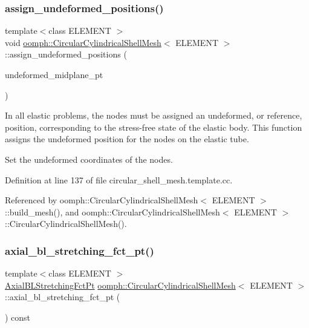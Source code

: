 \subsubsection{\texorpdfstring{assign\+\_\+undeformed\+\_\+positions()}{assign\_undeformed\_positions()}}
{\footnotesize\ttfamily template$<$class E\+L\+E\+M\+E\+NT $>$ \\
void \hyperlink{classoomph_1_1CircularCylindricalShellMesh}{oomph\+::\+Circular\+Cylindrical\+Shell\+Mesh}$<$ E\+L\+E\+M\+E\+NT $>$\+::assign\+\_\+undeformed\+\_\+positions (\begin{DoxyParamCaption}\item[{Geom\+Object $\ast$const \&}]{undeformed\+\_\+midplane\+\_\+pt }\end{DoxyParamCaption})}



In all elastic problems, the nodes must be assigned an undeformed, or reference, position, corresponding to the stress-\/free state of the elastic body. This function assigns the undeformed position for the nodes on the elastic tube. 

Set the undeformed coordinates of the nodes. 

Definition at line 137 of file circular\+\_\+shell\+\_\+mesh.\+template.\+cc.



Referenced by oomph\+::\+Circular\+Cylindrical\+Shell\+Mesh$<$ E\+L\+E\+M\+E\+N\+T $>$\+::build\+\_\+mesh(), and oomph\+::\+Circular\+Cylindrical\+Shell\+Mesh$<$ E\+L\+E\+M\+E\+N\+T $>$\+::\+Circular\+Cylindrical\+Shell\+Mesh().

\mbox{\label{classoomph_1_1CircularCylindricalShellMesh_aa9c69dc3c6692d19706178d558d07f86}} 
\subsubsection{\texorpdfstring{axial\+\_\+bl\+\_\+stretching\+\_\+fct\+\_\+pt()}{axial\_bl\_stretching\_fct\_pt()}}
{\footnotesize\ttfamily template$<$class E\+L\+E\+M\+E\+NT $>$ \\
\hyperlink{classoomph_1_1CircularCylindricalShellMesh_a770336fa72e8911f31b9fe3f70197a51}{Axial\+B\+L\+Stretching\+Fct\+Pt} \hyperlink{classoomph_1_1CircularCylindricalShellMesh}{oomph\+::\+Circular\+Cylindrical\+Shell\+Mesh}$<$ E\+L\+E\+M\+E\+NT $>$\+::axial\+\_\+bl\+\_\+stretching\+\_\+fct\+\_\+pt (\begin{DoxyParamCaption}{ }\end{DoxyParamCaption}) const\hspace{0.3cm}{\ttfamily [inline]}}



